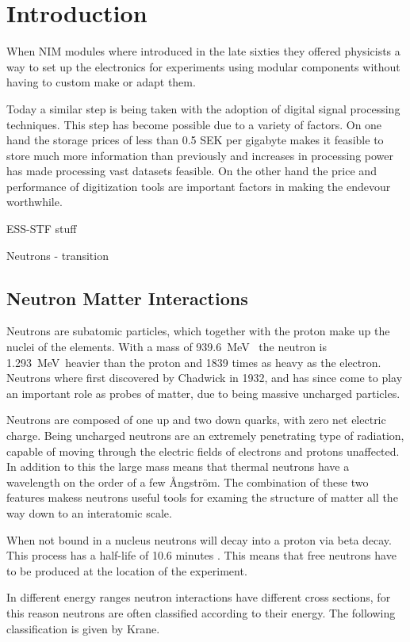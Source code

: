 \documentclass[main.tex]{subfiles}
\begin{document}
\chapter{Introduction}
When NIM modules where introduced in the late sixties they offered physicists a way to set up the electronics for experiments using modular components without having to custom make or adapt them. 

Today a similar step is being taken with the adoption of digital signal processing techniques. This step has become possible due to a variety of factors. On one hand the storage prices of less than 0.5 SEK per gigabyte makes it feasible to store much more information than previously and increases in processing power has made processing vast datasets feasible. On the other hand the price and performance of digitization tools are important factors in making the endevour worthwhile.

ESS-STF stuff

Neutrons - transition

\section{Neutron Matter Interactions}
Neutrons are subatomic particles, which together with the proton make up the nuclei of the elements. With a mass of \SI{939.6}{\MeV\;} the neutron is \SI{1.293}{\MeV\;}heavier than the proton and 1839 times as heavy as the electron. Neutrons where first discovered by Chadwick in 1932, and has since come to play an important role as probes of matter, due to being massive uncharged particles.

Neutrons are composed of one up and two down quarks, with zero net electric charge. Being uncharged neutrons are an extremely penetrating type of radiation, capable of moving through the electric fields of electrons and protons unaffected. In addition to this the large mass means that thermal neutrons have a wavelength on the order of a few Ångström. The combination of these two features makess neutrons useful tools for examing the structure of matter all the way down to an interatomic scale.

When not bound in a nucleus neutrons will decay into a proton via beta decay. This process has a half-life of 10.6 minutes \cite[pg.444]{Krane}. This means that free neutrons have to be produced at the location of the experiment.

In different energy ranges neutron interactions have different cross sections, for this reason neutrons are often classified according to their energy. The following classification is given by Krane\cite[444]{Krane}.
\end{document}
